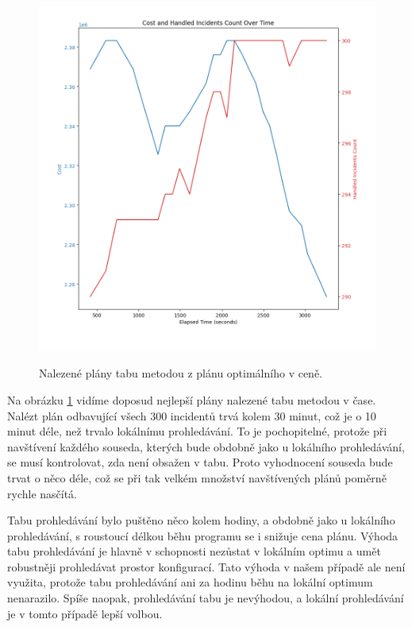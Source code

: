 \begin{figure}[H]
  \caption{Nalezené plány tabu metodou z plánu optimálního v ceně.}
  \includegraphics[width=\textwidth]{img/prague_hybrid_tabu.png}
  \centering
  \label{img:hybrid_tabu}
\end{figure}

Na obrázku \ref{img:hybrid_tabu} vidíme doposud nejlepší plány nalezené tabu metodou v čase.
Nalézt plán odbavující všech 300 incidentů trvá kolem 30 minut, což je o 10 minut déle, než trvalo lokálnímu prohledávání. 
To je pochopitelné, protože při navštívení každého souseda, kterých bude obdobně jako u lokálního prohledávání, se musí kontrolovat,
zda není obsažen v tabu. Proto vyhodnocení souseda bude trvat o něco déle, což se při tak velkém množství navštívených plánů poměrně rychle nasčítá.

Tabu prohledávání bylo puštěno něco kolem hodiny, a obdobně jako u lokálního prohledávání, s roustoucí délkou běhu programu se i snižuje cena plánu.
Výhoda tabu prohledávání je hlavně v schopnosti nezůstat v lokálním optimu a umět robustněji prohledávat prostor konfigurací.
Tato výhoda v našem případě ale není využita, protože tabu prohledávání ani za hodinu běhu na lokální optimum nenarazilo.
Spíše naopak, prohledávání tabu je nevýhodou, a lokální prohledávání je v tomto případě lepší volbou.

